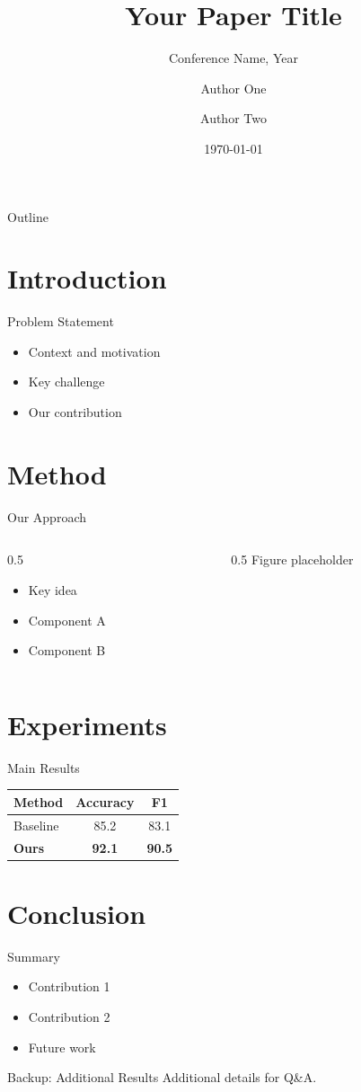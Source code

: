\documentclass[10pt, aspectratio=169]{beamer}
\title{Your Paper Title}
\subtitle{Conference Name, Year}
\author{Author One \and Author Two}
\institute{Institution}
\date{\today}
\begin{document}
\maketitle

\begin{frame}{Outline}
  \tableofcontents
\end{frame}

\section{Introduction}
\begin{frame}{Problem Statement}
  \begin{itemize}
    \item Context and motivation
    \item Key challenge
    \item Our contribution
  \end{itemize}
\end{frame}

\section{Method}
\begin{frame}{Our Approach}
  \begin{columns}[T]
    \begin{column}{0.5\textwidth}
      \begin{itemize}
        \item Key idea
        \item Component A
        \item Component B
      \end{itemize}
    \end{column}
    \begin{column}{0.5\textwidth}
      \centering
      Figure placeholder
    \end{column}
  \end{columns}
\end{frame}

\section{Experiments}
\begin{frame}{Main Results}
  \centering
  \begin{tabular}{lcc}
    \toprule
    Method & Accuracy & F1 \\
    \midrule
    Baseline & 85.2 & 83.1 \\
    \textbf{Ours} & \textbf{92.1} & \textbf{90.5} \\
    \bottomrule
  \end{tabular}
\end{frame}

\section{Conclusion}
\begin{frame}{Summary}
  \begin{itemize}
    \item Contribution 1
    \item Contribution 2
    \item Future work
  \end{itemize}
\end{frame}

\appendix
\begin{frame}{Backup: Additional Results}
  Additional details for Q\&A.
\end{frame}
\end{document}
